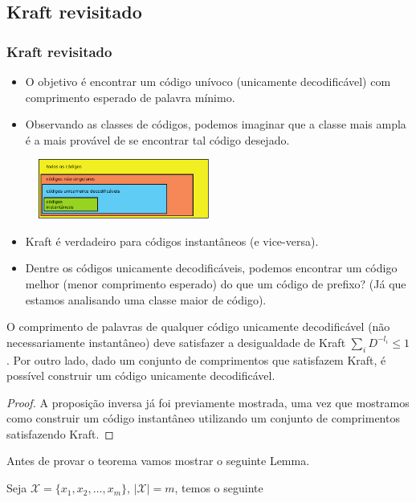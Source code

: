 \subsection{Kraft revisitado}
\begin{frame}[allowframebreaks]
  \frametitle{Kraft revisitado}
  \begin{itemize}
  \item O objetivo é encontrar um código unívoco (unicamente decodificável) com comprimento esperado de palavra mínimo.
  \item Observando as classes de códigos, podemos imaginar que a classe mais ampla é a mais provável de se encontrar tal código desejado.
  \end{itemize}

  \begin{figure}[h!]
  \centering
  \includegraphics[width=0.5\textwidth]{images/tiposcodigos.pdf}
  \label{fig:tiposcodigosagain}
  \end{figure}

  \begin{itemize}
  \item Kraft é verdadeiro para códigos instantâneos (e vice-versa).
  \item Dentre os códigos unicamente decodificáveis, podemos encontrar um código melhor (menor comprimento esperado)
	do que um código de prefixo? (Já que estamos analisando uma classe maior de código).
  \end{itemize}
 
  \begin{theorem}
  O comprimento de palavras de qualquer código unicamente decodificável (não necessariamente instantâneo)
  deve satisfazer a desigualdade de Kraft $\sum_i D^{-l_i} \leq 1$. Por outro lado, dado um conjunto de comprimentos
  que satisfazem Kraft, é possível construir um código unicamente decodificável.
  \end{theorem}
  \begin{proof}
  A proposição inversa já foi previamente mostrada, uma vez que mostramos como construir um código instantâneo 
  utilizando um conjunto de comprimentos satisfazendo Kraft.
  \end{proof}

  \framebreak
  Antes de provar o teorema vamos mostrar o seguinte Lemma.
  \begin{lemma}
  Seja $\mathcal{X} = \{x_1, x_2, \ldots, x_m \}$, $\vert \mathcal{X} \vert = m$, temos o seguinte


\end{lemma}
\end{frame}
